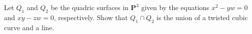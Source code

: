 Let $Q_1$ and $Q_2$ be the quadric surfaces in $\mathbf{P}^3$ given by the equations $x^2 - yw = 0$ and $xy - zw = 0$, respectively. Show that $Q_1 \cap Q_2$ is the union of a twisted cubic curve and a line.
